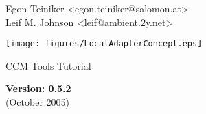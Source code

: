 \begin{titlepage}

\centering

\vspace*{20mm}
{\Large
Egon Teiniker <egon.teiniker@salomon.at>\\
Leif M. Johnson <leif@ambient.2y.net> \\
}

\vspace{30 mm}

\centerline{\texttt{[image: figures/LocalAdapterConcept.eps]}}

\vspace{30mm}

{\Huge CCM Tools Tutorial}\\ 

\vspace{30mm}

{\Large
\bf
Version: 0.5.2
}\\
(October 2005)
\end{titlepage}